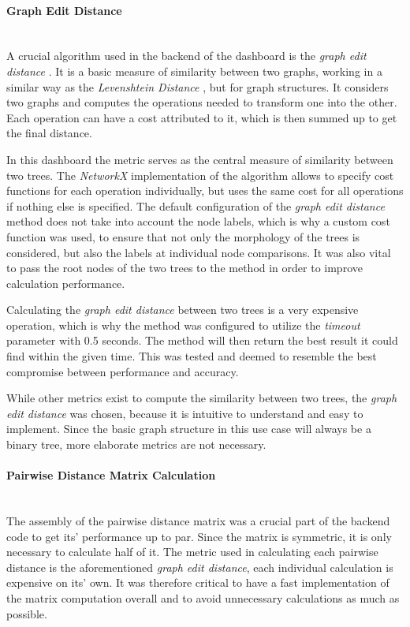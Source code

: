 \documentclass[a4paper, 12pt]{article}
\begin{document}
\paragraph{Graph Edit Distance}\mbox{}\\
A crucial algorithm used in the backend of the dashboard is the \textit{graph edit distance}
\cite{sanfeliu1983distance}. It is a basic measure of similarity between two graphs, working in
a similar way as the \textit{Levenshtein Distance} \cite{levenshtein1966binary}, but for graph
structures. It considers two graphs and computes the operations needed to transform one into the
other. Each operation can have a cost attributed to it, which is then summed up to get the final
distance. \par

In this dashboard the metric serves as the central measure of similarity between two trees. The
\textit{NetworkX} implementation of the algorithm allows to specify cost functions for each
operation individually, but uses the same cost for all operations if nothing else is specified.
The default configuration of the \textit{graph edit distance} method does not take into account
the node labels, which is why a custom cost function was used, to ensure that not only the
morphology of the trees is considered, but also the labels at individual node comparisons.
It was also vital to pass the root nodes of the two trees to the method in order to improve
calculation performance. \par

Calculating the \textit{graph edit distance} between two trees is a very expensive operation,
which is why the method was configured to utilize the \textit{timeout} parameter with 0.5 seconds.
The method will then return the best result it could find within the given time. This was tested
and deemed to resemble the best compromise between performance and accuracy.

While other metrics exist to compute the similarity between two trees, the \textit{graph edit
    distance} was chosen, because it is intuitive to understand and easy to implement. Since the
basic graph structure in this use case will always be a binary tree, more elaborate metrics
are not necessary.

\paragraph{Pairwise Distance Matrix Calculation}\mbox{}\\
The assembly of the pairwise distance matrix was a crucial part of the backend code to get its'
performance up to par. Since the matrix is symmetric, it is only necessary to calculate half of
it. The metric used in calculating each pairwise distance is the aforementioned \textit{graph
    edit distance}, each individual calculation is expensive on its' own. It was therefore critical
to have a fast implementation of the matrix computation overall and to avoid unnecessary
calculations as much as possible. \par
\end{document}
